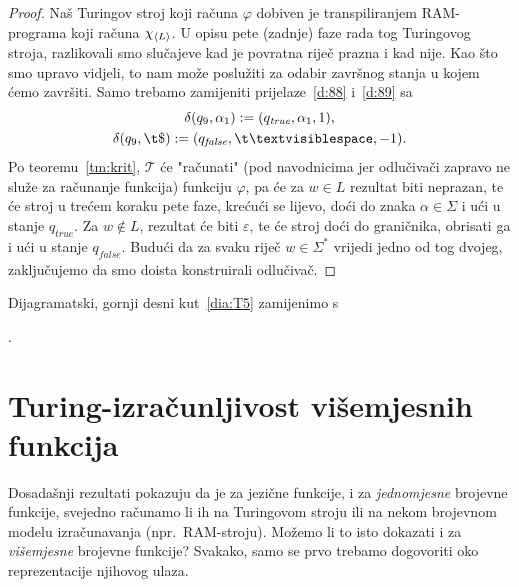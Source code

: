 \begin{proof}
Naš Turingov stroj koji računa $\varphi$ dobiven je transpiliranjem RAM-programa koji računa $\chi_{\langle L\rangle}$. U opisu pete (zadnje) faze rada tog Turingovog stroja, razlikovali smo slučajeve kad je povratna riječ prazna i kad nije. Kao što smo upravo vidjeli, to nam može poslužiti za odabir završnog stanja u kojem ćemo završiti. Samo trebamo zamijeniti prijelaze~\eqref{d:88} i~\eqref{d:89} sa
\begin{gather}
\label{eq:d88j}
    \delta(q_9,\alpha_1):=(q_\mathit{true},\alpha_1,1)\text,\\
\label{eq:d89j}
    \delta(q_9,\t\$):=(q_\mathit{false},\bl,-1)\text.
\end{gather}
Po teoremu~\ref{tm:krit}, $\mathcal T$ će "računati" (pod navodnicima jer odlučivači zapravo ne služe za računanje funkcija) funkciju $\varphi$, pa će za $w\in L$ rezultat biti neprazan, te će stroj u trećem koraku pete faze, krećući se lijevo, doći do znaka $\alpha\in\Sigma$ i ući u stanje $q_\mathit{true}$. Za $w\not\in L$, rezultat će biti $\varepsilon$, te će stroj doći do graničnika, obrisati ga i ući u stanje $q_\mathit{false}$. Budući da za svaku riječ $w\in\Sigma^*$ vrijedi jedno od tog dvojeg, zaključujemo da smo doista konstruirali odlučivač.
\end{proof}

Dijagramatski, gornji desni kut~\eqref{dia:T5} zamijenimo s\quad {}.

\section{Turing-izračunljivost višemjesnih funkcija}

Dosadašnji rezultati pokazuju da je za jezične funkcije, i za \emph{jednomjesne} brojevne funkcije, svejedno računamo li ih na Turingovom stroju ili na nekom brojevnom modelu izračunavanja (npr.\ RAM-stroju). Možemo li to isto dokazati i za \emph{višemjesne} brojevne funkcije? Svakako, samo se prvo trebamo dogovoriti oko reprezentacije njihovog ulaza.


